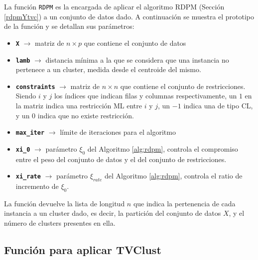 La función \texttt{RDPM} es la encargada de aplicar el algoritmo \acs{RDPM} (Sección \ref{rdpmYtvc}) a un conjunto de datos dado. A continuación se muestra el prototipo de la función y se detallan sus parámetros:


\begin{itemize}
	
	\item \textbf{\texttt{X}} {$\longrightarrow$ matriz de $n \times p$ que contiene el conjunto de datos}
	
	\item \textbf{\texttt{lamb}} {$\longrightarrow$ distancia mínima a la que se considera que una instancia no pertenece a un cluster, medida desde el centroide del mismo.}
	
	\item \textbf{\texttt{constraints}} {$\longrightarrow$ matriz de $n \times n$ que contiene el conjunto de restricciones. Siendo $i$ y $j$ los índices que indican filas y columnas respectivamente, un $1$ en la matriz indica una restricción \acs{ML} entre $i$ y $j$, un $-1$ indica una de tipo \acs{CL}, y un $0$ indica que no existe restricción.}
	
	\item \textbf{\texttt{max\_iter}} {$\longrightarrow$ límite de iteraciones para el algoritmo}
	
	\item \textbf{\texttt{xi\_0}} {$\longrightarrow$ parámetro $\xi_0$ del Algoritmo \ref{alg:rdpm}, controla el compromiso entre el peso del conjunto de datos y el del conjunto de restricciones.}
	
	\item \textbf{\texttt{xi\_rate}} {$\longrightarrow$ parámetro $\xi_{rate}$ del Algoritmo \ref{alg:rdpm}, controla el ratio de incremento de $\xi_0$.}
	
\end{itemize}

La función devuelve la lista de longitud $n$ que indica la pertenencia de cada instancia a un cluster dado, es decir, la partición del conjunto de datos $X$, y el número de clusters presentes en ella.

\subsection{Función para aplicar TVClust}


